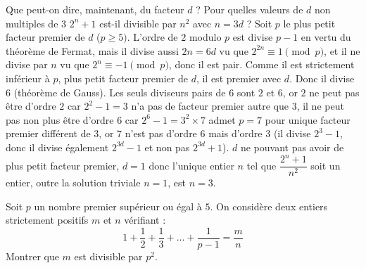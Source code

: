 \begin{sol}
Que peut-on dire, maintenant, du facteur $d$ ? Pour quelles valeurs de $d$ non multiples de $3$ $2^n+1$ est-il divisible par $n^2$ avec $n = 3d$ ? Soit $p$ le plus petit facteur premier de $d$ ($p\geq 5)$. L'ordre de $2$ modulo $p$ est divise $p-1$ en vertu du théorème de Fermat, mais il divise aussi $2n = 6d$ vu que $2^{2n} \equiv 1 \pmod{p}$, et il ne divise par $n$ vu que $2^n \equiv -1 \pmod{p}$, donc il est pair. Comme il est strictement inférieur à $p$, plus petit facteur premier de $d$, il est premier avec $d$. Donc il divise $6$ (théorème de Gauss). Les seuls diviseurs pairs de $6$ sont $2$ et $6$, or $2$ ne peut pas être d'ordre $2$ car $2^2 - 1 = 3$ n'a pas de facteur premier autre que $3$, il ne peut pas non plus être d'ordre $6$ car $2^6 - 1 = 3^2 \times 7$ admet $p = 7$ pour unique facteur premier différent de $3$, or $7$ n'est pas d'ordre $6$ mais d'ordre $3$ (il divise $2^3-1$, donc il divise également $2^{3d}-1$ et non pas $2^{3d}+1$). $d$ ne pouvant pas avoir de plus petit facteur premier, $d = 1$ donc l'unique entier $n$ tel que $\dfrac{2^n+1}{n^2}$ soit un entier, outre la solution triviale $n = 1$, est $n = 3$.

\end{sol}

\bigskip

\begin{exo}

\medskip

Soit $p$ un nombre premier supérieur ou égal à $5$. On considère deux entiers strictement positifs $m$ et $n$ vérifiant : 
$$ 1 + \dfrac12 + \dfrac13 + ... + \dfrac1{p-1} = \dfrac{m}{n}$$
Montrer que $m$ est divisible par $p^2$. 

\end{exo}


\bigskip

